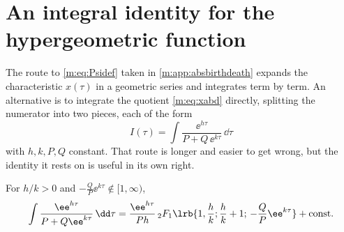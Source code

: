 \section{An integral identity for the hypergeometric function}
\label{m:app:hyp}

The route to \cref{m:eq:Psidef} taken in \cref{m:app:absbirthdeath} expands the
characteristic $x(\tau)$ in a geometric series and integrates term by term. An
alternative is to integrate the quotient \cref{m:eq:xabd} directly, splitting the
numerator into two pieces, each of the form
\begin{equation}
\label{m:eq:Iform}
I(\tau) = \int\frac{\ee^{h\tau}}{P+Q\,\ee^{k\tau}}\,\dd\tau
\end{equation}
with $h,k,P,Q$ constant. That route is longer and easier to get wrong, but the
identity it rests on is useful in its own right.

\begin{proposition}
\label{m:prop:hypIden}
For $h/k>0$ and $-\tfrac{Q}{P}\ee^{k\tau}\notin[1,\infty)$,
\begin{equation}
\label{m:eq:hypIden}
\int\frac{\ee^{h\tau}}{P+Q\ee^{k\tau}}\,\dd\tau
= \frac{\ee^{h\tau}}{Ph}\,{}_2F_1\lrb{1,\frac{h}{k};\frac{h}{k}+1;\,-\frac{Q}{P}\ee^{k\tau}}
+ \text{const} .
\end{equation}
\end{proposition}

